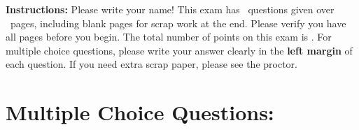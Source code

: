 \documentclass[addpoints,answers,12pt]{exam}
\begin{document}
\CorrectChoiceEmphasis{\bfseries \color{red}}

\vspace*{0.1in}


\vspace{0.2in}

\textbf{Instructions:} Please write your name! This exam has \numquestions\ questions given over \numpages\ pages, including blank pages for scrap work at the end. Please verify you have all pages before you begin. The total number of points on this exam is \numpoints. For multiple choice questions, please write your answer clearly in the \textbf{left margin} of each question. If you need extra scrap paper, please see the proctor.

\vspace{0.2in}

\section*{Multiple Choice Questions:}
\end{document}
